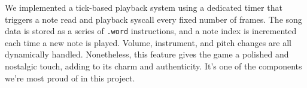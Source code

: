 \documentclass{article}
\begin{document}
We implemented a tick-based playback system using a dedicated timer that triggers a note read and playback syscall every fixed number of frames. The song data is stored as a series of \texttt{.word} instructions, and a note index is incremented each time a new note is played. Volume, instrument, and pitch changes are all dynamically handled. Nonetheless, this feature gives the game a polished and nostalgic touch, adding to its charm and authenticity. It's one of the components we're most proud of in this project.
\end{document}
